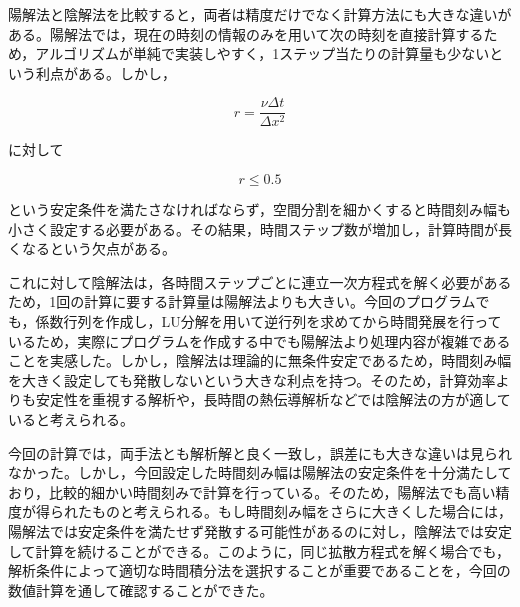 \documentclass[dvipdfmx]{jsarticle}
\begin{document}
陽解法と陰解法を比較すると，両者は精度だけでなく計算方法にも大きな違いがある。陽解法では，現在の時刻の情報のみを用いて次の時刻を直接計算するため，アルゴリズムが単純で実装しやすく，1ステップ当たりの計算量も少ないという利点がある。しかし，

\[
r=\frac{\nu\Delta t}{\Delta x^2}
\]

に対して

\[
r\le0.5
\]

という安定条件を満たさなければならず，空間分割を細かくすると時間刻み幅も小さく設定する必要がある。その結果，時間ステップ数が増加し，計算時間が長くなるという欠点がある。

これに対して陰解法は，各時間ステップごとに連立一次方程式を解く必要があるため，1回の計算に要する計算量は陽解法よりも大きい。今回のプログラムでも，係数行列を作成し，LU分解を用いて逆行列を求めてから時間発展を行っているため，実際にプログラムを作成する中でも陽解法より処理内容が複雑であることを実感した。しかし，陰解法は理論的に無条件安定であるため，時間刻み幅を大きく設定しても発散しないという大きな利点を持つ。そのため，計算効率よりも安定性を重視する解析や，長時間の熱伝導解析などでは陰解法の方が適していると考えられる。

今回の計算では，両手法とも解析解と良く一致し，誤差にも大きな違いは見られなかった。しかし，今回設定した時間刻み幅は陽解法の安定条件を十分満たしており，比較的細かい時間刻みで計算を行っている。そのため，陽解法でも高い精度が得られたものと考えられる。もし時間刻み幅をさらに大きくした場合には，陽解法では安定条件を満たせず発散する可能性があるのに対し，陰解法では安定して計算を続けることができる。このように，同じ拡散方程式を解く場合でも，解析条件によって適切な時間積分法を選択することが重要であることを，今回の数値計算を通して確認することができた。
\end{document}
